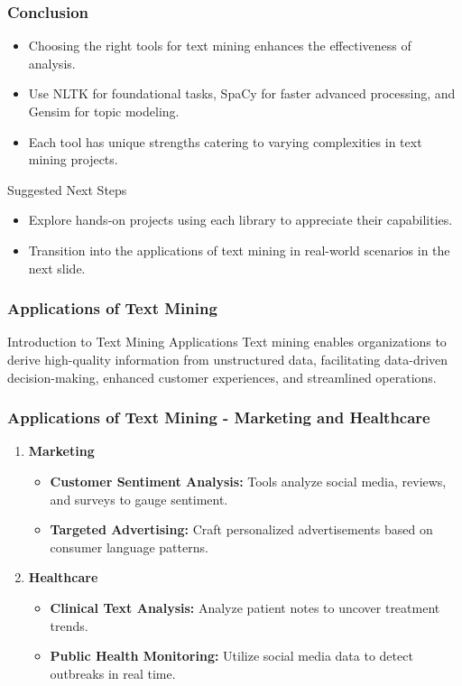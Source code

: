 \documentclass[aspectratio=169]{beamer}
\begin{document}
\begin{frame}
    \frametitle{Conclusion}
    \begin{itemize}
        \item Choosing the right tools for text mining enhances the effectiveness of analysis.
        \item Use NLTK for foundational tasks, SpaCy for faster advanced processing, and Gensim for topic modeling.
        \item Each tool has unique strengths catering to varying complexities in text mining projects.
    \end{itemize}
    \begin{block}{Suggested Next Steps}
        \begin{itemize}
            \item Explore hands-on projects using each library to appreciate their capabilities.
            \item Transition into the applications of text mining in real-world scenarios in the next slide.
        \end{itemize}
    \end{block}
\end{frame}

\begin{frame}[fragile]
    \frametitle{Applications of Text Mining}
    \begin{block}{Introduction to Text Mining Applications}
        Text mining enables organizations to derive high-quality information from unstructured data, facilitating data-driven decision-making, enhanced customer experiences, and streamlined operations.
    \end{block}
\end{frame}

\begin{frame}[fragile]
    \frametitle{Applications of Text Mining - Marketing and Healthcare}
    \begin{enumerate}
        \item \textbf{Marketing}
        \begin{itemize}
            \item \textbf{Customer Sentiment Analysis:} Tools analyze social media, reviews, and surveys to gauge sentiment.
            \item \textbf{Targeted Advertising:} Craft personalized advertisements based on consumer language patterns.
        \end{itemize}

        \item \textbf{Healthcare}
        \begin{itemize}
            \item \textbf{Clinical Text Analysis:} Analyze patient notes to uncover treatment trends.
            \item \textbf{Public Health Monitoring:} Utilize social media data to detect outbreaks in real time.
        \end{itemize}
    \end{enumerate}
\end{frame}
\end{document}

